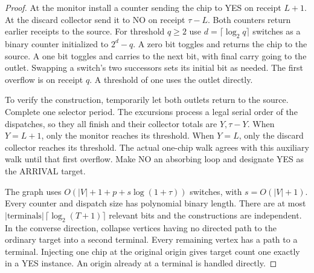 \documentclass[11pt,oneside,openany,notitlepage]{report}
\begin{document}
\begin{proof}
At the monitor install a counter sending the chip to YES on receipt \(L+1\).
At the discard collector send it to NO on receipt \(\tau-L\). Both counters
return earlier receipts to the source. For threshold \(q\ge2\) use
\(d=\lceil\log_2q\rceil\) switches as a binary counter initialized to
\(2^d-q\). A zero bit toggles and returns the chip to the source. A one bit
toggles and carries to the next bit, with final carry going to the outlet.
Swapping a switch's two successors sets its initial bit as needed. The
first overflow is on receipt \(q\). A threshold of one uses the outlet
directly.

To verify the construction, temporarily let both outlets return to the
source. Complete one selector period. The excursions process a legal serial
order of the dispatches, so they all finish and their collector totals are
\(Y,\tau-Y\). When \(Y=L+1\), only the monitor reaches its threshold. When
\(Y=L\), only the discard collector reaches its threshold. The actual
one-chip walk agrees with this auxiliary walk until that first overflow.
Make NO an absorbing loop and designate YES as the ARRIVAL target.

The graph uses \(O(|V|+1+p+s\log(1+\tau))\) switches, with \(s=O(|V|+1)\).
Every counter and dispatch size has polynomial binary length. There are at
most \(|\mathrm{terminals}|\,\lceil\log_2(T+1)\rceil\) relevant bits and
the constructions are independent. In the converse direction, collapse
vertices having no directed path to the ordinary target into a second
terminal. Every remaining vertex has a path to a terminal. Injecting one
chip at the original origin gives target count one exactly in a YES
instance. An origin already at a terminal is handled directly.
\end{proof}
\end{document}
